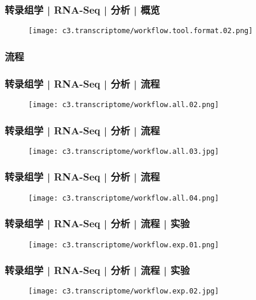 \begin{frame}
  \frametitle{转录组学 | RNA-Seq | 分析 | 概览}
  \begin{figure}
    \centering
    \texttt{[image: c3.transcriptome/workflow.tool.format.02.png]}
  \end{figure}
\end{frame}

\subsubsection{流程}
\begin{frame}
  \frametitle{转录组学 | RNA-Seq | 分析 | 流程}
  \begin{figure}
    \centering
    \texttt{[image: c3.transcriptome/workflow.all.02.png]}
  \end{figure}
\end{frame}

\begin{frame}
  \frametitle{转录组学 | RNA-Seq | 分析 | 流程}
  \begin{figure}
    \centering
    \texttt{[image: c3.transcriptome/workflow.all.03.jpg]}
  \end{figure}
\end{frame}

\begin{frame}
  \frametitle{转录组学 | RNA-Seq | 分析 | 流程}
  \begin{figure}
    \centering
    \texttt{[image: c3.transcriptome/workflow.all.04.png]}
  \end{figure}
\end{frame}

\begin{frame}
  \frametitle{转录组学 | RNA-Seq | 分析 | 流程 | 实验}
  \begin{figure}
    \centering
    \texttt{[image: c3.transcriptome/workflow.exp.01.png]}
  \end{figure}
\end{frame}

\begin{frame}
  \frametitle{转录组学 | RNA-Seq | 分析 | 流程 | 实验}
  \begin{figure}
    \centering
    \texttt{[image: c3.transcriptome/workflow.exp.02.jpg]}
  \end{figure}
\end{frame}

